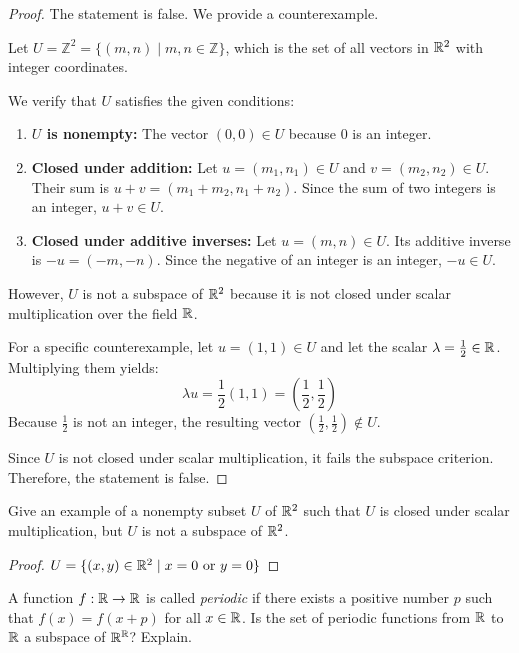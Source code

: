 \begin{proof}
	The statement is false. We provide a counterexample.
	
	Let $U = \mathbb{Z}^2 = \{(m, n) \mid m, n \in \mathbb{Z}\}$, which is the set of all vectors in $\mathbb{R}^2$ with integer coordinates. 
	
	We verify that $U$ satisfies the given conditions:
	\begin{enumerate}
		\item \textbf{$U$ is nonempty:} The vector $(0, 0) \in U$ because $0$ is an integer.
		\item \textbf{Closed under addition:} Let $u = (m_1, n_1) \in U$ and $v = (m_2, n_2) \in U$. Their sum is $u + v = (m_1 + m_2, n_1 + n_2)$. Since the sum of two integers is an integer, $u + v \in U$.
		\item \textbf{Closed under additive inverses:} Let $u = (m, n) \in U$. Its additive inverse is $-u = (-m, -n)$. Since the negative of an integer is an integer, $-u \in U$.
	\end{enumerate}
	
	However, $U$ is not a subspace of $\mathbb{R}^2$ because it is not closed under scalar multiplication over the field $\mathbb{R}$. 
	
	For a specific counterexample, let $u = (1, 1) \in U$ and let the scalar $\lambda = \frac{1}{2} \in \mathbb{R}$. Multiplying them yields:
	\[ \lambda u = \frac{1}{2}(1, 1) = \left(\frac{1}{2}, \frac{1}{2}\right) \]
	Because $\frac{1}{2}$ is not an integer, the resulting vector $\left(\frac{1}{2}, \frac{1}{2}\right) \notin U$. 
	
	Since $U$ is not closed under scalar multiplication, it fails the subspace criterion. Therefore, the statement is false.
\end{proof}
\begin{question}
	Give an example of a nonempty subset $U$ of $\mathbb{R}^2$ such that $U$ is closed under scalar multiplication, but $U$ is not a subspace of $\mathbb{R}^2$.
\end{question}
\begin{proof}
	$ U = \{(x, y) \in \mathbb{R}^2 \mid x = 0 \text{ or } y = 0\} $
\end{proof}
\begin{question}
	A function $f : \mathbb{R} \to \mathbb{R}$ is called \textit{periodic} if there exists a positive number $p$ such that $f(x) = f(x + p)$ for all $x \in \mathbb{R}$. Is the set of periodic functions from $\mathbb{R}$ to $\mathbb{R}$ a subspace of $\mathbb{R}^{\mathbb{R}}$? Explain.
\end{question}
